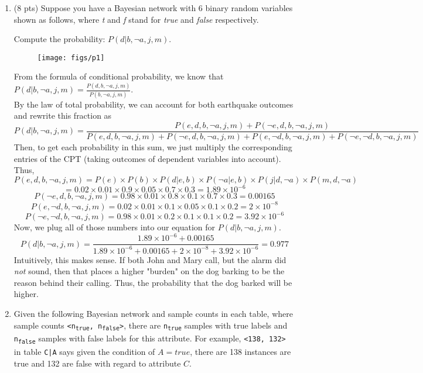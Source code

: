 \documentclass{article}
\newenvironment{soln}{
	\leavevmode\color{blue}\ignorespaces
}{}
\begin{document}
\begin{enumerate}
\item (8 pts) Suppose you have a Bayesian network with 6 binary random variables shown as follows, where \emph{t} and \emph{f} stand for \emph{true} and \emph{false} respectively.

Compute the probability: $P(d | b, \neg a, j, m)$.

\begin{figure}[h]
\centering
\texttt{[image: figs/p1]}
\label{fig:q1}
\end{figure}

\begin{soln}
From the formula of conditional probability, we know that $P(d | b, \neg a, j, m) = \frac{P(d, b, \neg a, j, m)}{P(b, \neg a, j, m)}$. \\ By the law of total probability, we can account for both earthquake outcomes and rewrite this fraction as  
\[ P(d | b, \neg a, j, m) = \frac{P(e,d, b, \neg a, j, m) + P(\neg e, d, b, \neg a, j, m)}{P(e, d, b, \neg a, j, m) + P(\neg e, d, b, \neg a, j, m) + P(e, \neg d, b, \neg a, j, m) + P(\neg e, \neg d, b, \neg a, j, m)} \]
Then, to get each probability in this sum, we just multiply the corresponding entries of the CPT (taking outcomes of dependent variables into account). Thus,
\[ P(e,d, b, \neg a, j, m) = P(e) \times P(b) \times P(d | e, b) \times P(\neg a | e, b) \times P(j | d, \neg a) \times P(m, d, \neg a) \]
\[ = 0.02 \times 0.01 \times 0.9 \times 0.05 \times 0.7 \times 0.3 = 1.89\times10^{-6}\] 
\[P(\neg e, d, b, \neg a, j, m) = 0.98 \times 0.01 \times 0.8 \times 0.1 \times 0.7 \times 0.3 = 0.00165\]
\[P(e, \neg d, b, \neg a, j, m) = 0.02 \times 0.01 \times 0.1 \times 0.05 \times 0.1 \times 0.2 = 2\times 10^{-8}\]
\[P(\neg e, \neg d, b, \neg a, j, m) = 0.98 \times 0.01 \times 0.2 \times 0.1 \times 0.1 \times 0.2 = 3.92\times 10^{-6}\]
Now, we plug all of those numbers into our equation for $P(d | b, \neg a, j, m)$.
\[P(d | b, \neg a, j, m) = \frac{1.89\times10^{-6} + 0.00165}{1.89\times10^{-6} + 0.00165 + 2\times 10^{-8} +  3.92\times 10^{-6}} = 0.977\]
Intuitively, this makes sense. If both John and Mary call, but the alarm did \textit{not} sound, then that places a higher "burden" on the dog barking to be the reason behind their calling. Thus, the probability that the dog barked will be higher.
\end{soln}

\pagebreak


\item Given the following Bayesian network and sample counts in each table, where sample counts \texttt{<n\textsubscript{true}, n\textsubscript{false}>}, there are \texttt{n\textsubscript{true}} samples with true labels and \texttt{n\textsubscript{false}} samples with false labels for this attribute. For example, \texttt{<138, 132>} in table \texttt{C|A} says given the condition of $A = true$, there are 138 instances are true and 132 are false with regard to attribute $C$.


\end{enumerate}
\end{document}
